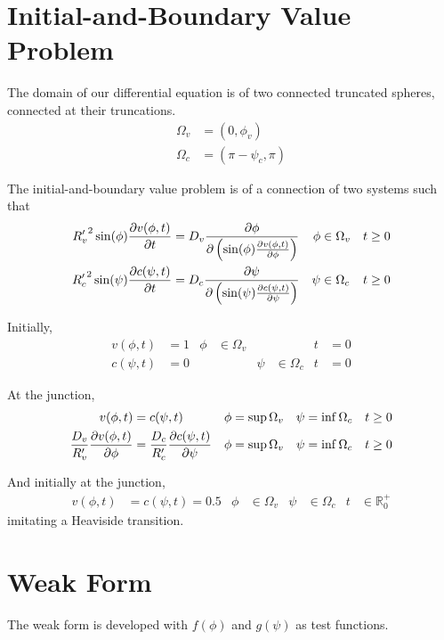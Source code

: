 \documentclass{report}
\newcommand\Par[1]{{ \left({#1}\right) }}
\newcommand\bbR{{ \mathbb{R} }}
\newcommand\Rc{{ R'_c }}
\newcommand\Rv{{ R'_v }}
\begin{document}
\section{Initial-and-Boundary Value Problem}
The domain of our differential equation is of two connected truncated spheres, connected at their truncations.
\begin{align*}
	\Omega_v &= (0, \phi_v) \\
	\Omega_c &= (\pi - \psi_c, \pi)
\end{align*}

The initial-and-boundary value problem is of a connection of two systems such that
\begin{align*}
	\Rv^2 \sin(\phi) \pdv{v(\phi, t)}{t} &= D_v \pdv\phi \Par{\sin(\phi) \pdv{v(\phi, t)}{\phi}}
	& \phi &\in \Omega_v
	& t &\geq 0 \\
	\Rc^2 \sin(\psi) \pdv{c(\psi, t)}{t} &= D_c \pdv\psi \Par{\sin(\psi) \pdv{c(\psi, t)}{\psi}}
	& \psi &\in \Omega_c
	& t &\geq 0
\end{align*}

Initially,
\begin{align*}
	v(\phi, t) &= 1 & \phi &\in \Omega_v & & & t &= 0 \\
	c(\psi, t) &= 0 & & & \psi &\in \Omega_c & t &= 0
\end{align*}

At the junction,
\begin{align*}
	v(\phi, t) &= c(\psi, t)
	& \phi &= \sup\Omega_v
	& \psi &= \inf\Omega_c
	& t &\geq 0 \\
	\frac{D_v}{\Rv} \pdv{v(\phi, t)}{\phi} &= \frac{D_c}{\Rc} \pdv{c(\psi, t)}{\psi}
	& \phi &= \sup\Omega_v
	& \psi &= \inf\Omega_c
	& t &\geq 0
\end{align*}

And initially at the junction,
\begin{align*}
	v(\phi, t) &= c(\psi, t) = 0.5 & \phi &\in \Omega_v & \psi &\in \Omega_c & t &\in \bbR_0^+
\end{align*}
imitating a Heaviside transition.

\section{Weak Form}
The weak form is developed with $f(\phi)$ and $g(\psi)$ as test functions.
\end{document}
